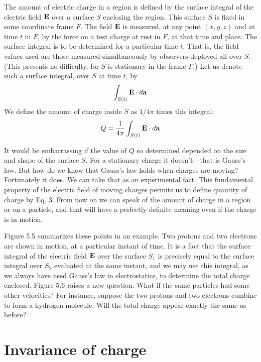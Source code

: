 The amount of electric charge in a region is defined by the surface
integral of the electric field $\mathbf{E}$ over a surface $S$ enclosing the region.
This surface $S$ is fixed in some coordinate frame $F$. The field $\mathbf{E}$ is
measured, at any point $(x,y,z)$ and at time $t$ in $F$, by the force on a
test charge at rest in $F$, at that time and place. The surface integral
is to be determined for a particular time $t$. That is, the field values
used are those measured simultaneously by observers deployed all
over $S$. (This presents no difficulty, for $S$ is stationary in the frame $F$.)
Let us denote such a surface integral, over $S$ at time $t$, by
\begin{equation}
  \int_{S(t)} \mathbf{E}\cdot d\mathbf{a}
\end{equation}
We define the amount of charge inside $S$ as $1/4\pi$ times this integral:
\begin{equation}
  Q = \frac{1}{4\pi} \int_{S(t)} \mathbf{E}\cdot d\mathbf{a}
\end{equation}

It would be embarrassing if the value of $Q$ so determined depended
on the size and shape of the surface $S$. For a stationary charge it
doesn't---that is Gauss's law. But how do we know that Gauss's law
holds when charges are moving? Fortunately it does. We can take
that as an experimental fact. This fundamental property of the
electric field of moving charges permits us to define quantity of
charge by Eq. 3. From now on we can speak of the amount of charge
in a region or on a particle, and that will have a perfectly definite
meaning even if the charge is in motion.

Figure 5.5 summarizes these points in an example. Two protons
and two electrons are shown in motion, at a particular instant of
time. It is a fact that the surface integral of the electric field $\mathbf{E}$ over
the surface $S_1$ is precisely equal to the surface integral over $S_2$
evaluated at the same instant, and we may use this integral, as we
always have used Gauss's law in electrostatics, to determine the total
charge enclosed. Figure 5.6 raises a new question. What if the
same particles had some other velocities? For instance, suppose the
two protons and two electrons combine to form a hydrogen molecule.
Will the total charge appear exactly the same as before?

\iffalse

\section{Invariance of charge}

